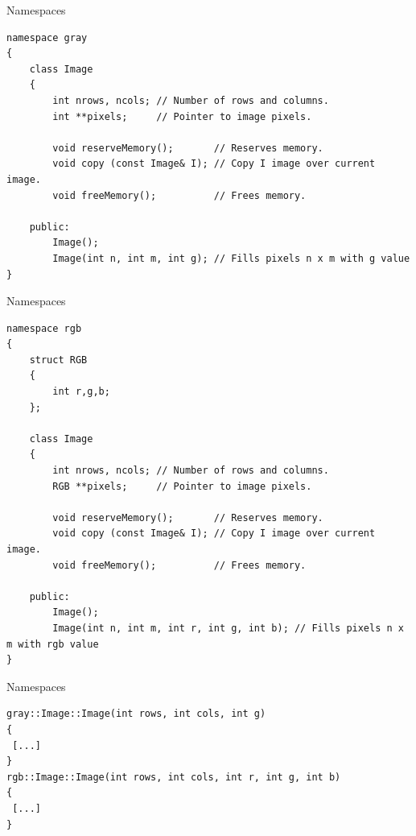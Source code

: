 \documentclass[aspectratio=169,presentation]{beamer}
\begin{document}
\begin{frame}[label={sec:org313389b},fragile]{Namespaces}
 \begin{verbatim}
namespace gray
{
	class Image
	{
		int nrows, ncols; // Number of rows and columns.
		int **pixels;     // Pointer to image pixels.
		
		void reserveMemory();       // Reserves memory.
		void copy (const Image& I); // Copy I image over current image.
		void freeMemory();          // Frees memory.
		
	public:
		Image();
		Image(int n, int m, int g); // Fills pixels n x m with g value
}
\end{verbatim}
\end{frame}
\begin{frame}[label={sec:orge070dc8},fragile]{Namespaces}
 \begin{verbatim}
namespace rgb
{
	struct RGB
	{
		int r,g,b;
	};
		
	class Image
	{
		int nrows, ncols; // Number of rows and columns.
		RGB **pixels;     // Pointer to image pixels.
		
		void reserveMemory();       // Reserves memory.
		void copy (const Image& I); // Copy I image over current image.
		void freeMemory();          // Frees memory.
		
	public:
		Image();
		Image(int n, int m, int r, int g, int b); // Fills pixels n x m with rgb value
}
\end{verbatim}
\end{frame}
\begin{frame}[label={sec:org84f26fd},fragile]{Namespaces}
 \begin{verbatim}
gray::Image::Image(int rows, int cols, int g)
{
 [...]
}
rgb::Image::Image(int rows, int cols, int r, int g, int b)
{
 [...]
}
\end{verbatim}
\end{frame}
\end{document}
